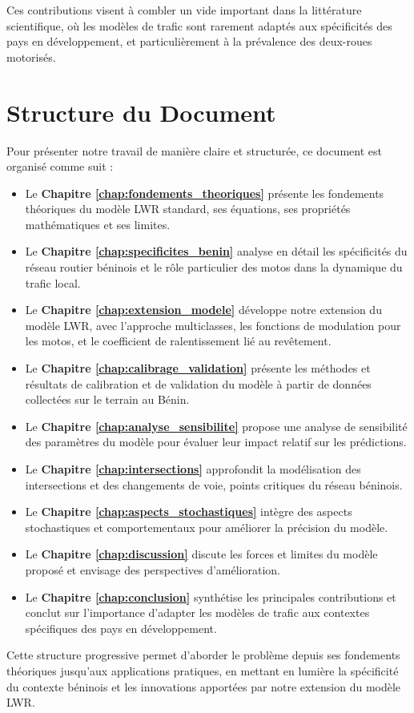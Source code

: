 Ces contributions visent à combler un vide important dans la littérature scientifique, où les modèles de trafic sont rarement adaptés aux spécificités des pays en développement, et particulièrement à la prévalence des deux-roues motorisés.

\section{Structure du Document}
\label{sec:structure}

Pour présenter notre travail de manière claire et structurée, ce document est organisé comme suit :

\begin{itemize}
\item Le \textbf{Chapitre \ref{chap:fondements_theoriques}} présente les fondements théoriques du modèle LWR standard, ses équations, ses propriétés mathématiques et ses limites.

\item Le \textbf{Chapitre \ref{chap:specificites_benin}} analyse en détail les spécificités du réseau routier béninois et le rôle particulier des motos dans la dynamique du trafic local.

\item Le \textbf{Chapitre \ref{chap:extension_modele}} développe notre extension du modèle LWR, avec l'approche multiclasses, les fonctions de modulation pour les motos, et le coefficient de ralentissement lié au revêtement.

\item Le \textbf{Chapitre \ref{chap:calibrage_validation}} présente les méthodes et résultats de calibration et de validation du modèle à partir de données collectées sur le terrain au Bénin.

\item Le \textbf{Chapitre \ref{chap:analyse_sensibilite}} propose une analyse de sensibilité des paramètres du modèle pour évaluer leur impact relatif sur les prédictions.

\item Le \textbf{Chapitre \ref{chap:intersections}} approfondit la modélisation des intersections et des changements de voie, points critiques du réseau béninois.

\item Le \textbf{Chapitre \ref{chap:aspects_stochastiques}} intègre des aspects stochastiques et comportementaux pour améliorer la précision du modèle.

\item Le \textbf{Chapitre \ref{chap:discussion}} discute les forces et limites du modèle proposé et envisage des perspectives d'amélioration.

\item Le \textbf{Chapitre \ref{chap:conclusion}} synthétise les principales contributions et conclut sur l'importance d'adapter les modèles de trafic aux contextes spécifiques des pays en développement.
\end{itemize}

Cette structure progressive permet d'aborder le problème depuis ses fondements théoriques jusqu'aux applications pratiques, en mettant en lumière la spécificité du contexte béninois et les innovations apportées par notre extension du modèle LWR.
